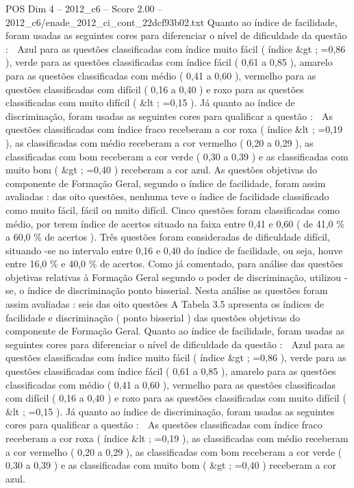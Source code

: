 \begin{textsample}{POS Dim 4 – 2012\_c6 – Score 2.00 – 2012\_c6/enade\_2012\_ci\_cont\_22dcf93b02.txt}
Quanto ao índice de facilidade, foram usadas as seguintes cores para diferenciar o nível de dificuldade da questão :  Azul para as questões classificadas com índice muito fácil ( índice \&gt ; =0,86 ), verde para as questões classificadas com índice fácil ( 0,61 a 0,85 ), amarelo para as questões classificadas com médio ( 0,41 a 0,60 ), vermelho para as questões classificadas com difícil ( 0,16 a 0,40 ) e roxo para as questões classificadas com muito difícil ( \&lt ; =0,15 ).
Já quanto ao índice de discriminação, foram usadas as seguintes cores para qualificar a questão :  As questões classificadas com índice fraco receberam a cor roxa ( índice \&lt ; =0,19 ), as classificadas com médio receberam a cor vermelho ( 0,20 a 0,29 ), as classificadas com bom receberam a cor verde ( 0,30 a 0,39 ) e as classificadas com muito bom ( \&gt ; =0,40 ) receberam a cor azul.
As questões objetivas do componente de Formação Geral, segundo o índice de facilidade, foram assim avaliadas : das oito questões, nenhuma teve o índice de facilidade classificado como muito fácil, fácil ou muito difícil.
Cinco questões foram classificadas como médio, por terem índice de acertos situado na faixa entre 0,41 e 0,60 ( de 41,0 \% a 60,0 \% de acertos ).
Três questões foram consideradas de dificuldade difícil, situando -se no intervalo entre 0,16 e 0,40 do índice de facilidade, ou seja, houve entre 16,0 \% e 40,0 \% de acertos.
Como já comentado, para análise das questões objetivas relativas à Formação Geral segundo o poder de discriminação, utilizou -se, o índice de discriminação ponto bisserial.
Nesta análise as questões foram assim avaliadas : seis das oito questões A Tabela 3.5 apresenta os índices de facilidade e discriminação ( ponto bisserial ) das questões objetivas do componente de Formação Geral.
Quanto ao índice de facilidade, foram usadas as seguintes cores para diferenciar o nível de dificuldade da questão :  Azul para as questões classificadas com índice muito fácil ( índice \&gt ; =0,86 ), verde para as questões classificadas com índice fácil ( 0,61 a 0,85 ), amarelo para as questões classificadas com médio ( 0,41 a 0,60 ), vermelho para as questões classificadas com difícil ( 0,16 a 0,40 ) e roxo para as questões classificadas com muito difícil ( \&lt ; =0,15 ).
Já quanto ao índice de discriminação, foram usadas as seguintes cores para qualificar a questão :  As questões classificadas com índice fraco receberam a cor roxa ( índice \&lt ; =0,19 ), as classificadas com médio receberam a cor vermelho ( 0,20 a 0,29 ), as classificadas com bom receberam a cor verde ( 0,30 a 0,39 ) e as classificadas com muito bom ( \&gt ; =0,40 ) receberam a cor azul.

\end{textsample}
